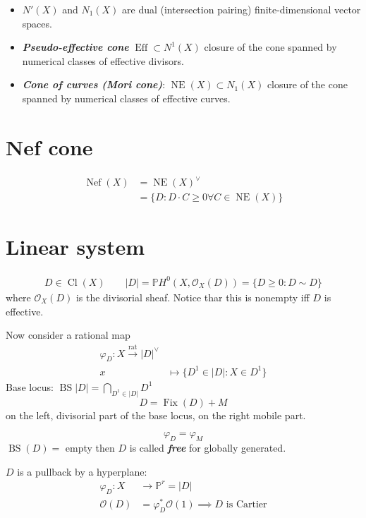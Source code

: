 \begin{itemize}
\item $N'(X)$ and  $N_1(X)$ are dual (intersection pairing) finite-dimensional vector spaces.
\item \textit{\textbf{Pseudo-effective cone}}  $\operatorname{Eff}\subset N^1(X)$ closure of the cone spanned by numerical classes of effective divisors.
\item \textit{\textbf{Cone of curves (Mori cone)}}:  $\operatorname{NE}(X)\subset N_1(X)$ closure of the cone spanned by numerical classes of effective curves.
\end{itemize}

\section{Nef cone}

\begin{align*}
	\operatorname{Nef}(X)&=\operatorname{NE}(X)^\vee\\
	&=\{D:D\cdot C\geq 0\forall C\in \operatorname{NE}(X)\}
\end{align*}

\section{Linear system}

\begin{align*}
	D\in\operatorname{Cl}(X)\qquad |D| =\mathbb{P}H^{0}(X,\mathcal{O}_X(D))=\{D\geq 0:D\sim D\}
\end{align*}
where $\mathcal{O}_X(D)$ is the divisorial sheaf. Notice thar this is nonempty iff $D$ is effective.

Now consider a rational map
\begin{align*}
	\varphi _D:X\overset{\operatorname{rat}}{\longrightarrow}|D|^\vee\\
	x &\longmapsto \{D^1\in |D| :X\in D^1\}
\end{align*}
Base locus: $\operatorname{BS}|D| =\bigcap_{D^1\in |D|}D^1$ 
\[D=\operatorname{Fix}(D)+M\]
on the left, divisorial part of the base locus, on the right mobile part.

\[\varphi_D=\varphi_M\]
$\operatorname{BS}(D)=$ empty then $D$ is called \textit{\textbf{free}} for globally generated.

 $D$ is a pullback by a hyperplane:
 \begin{align*}
 	\varphi_D: X &\longrightarrow \mathbb{P}^r=|D| \\
 	\mathcal{O}(D)&=\varphi^*_D\mathcal{O}(1)\implies D \text{ is Cartier} 
 \end{align*}

